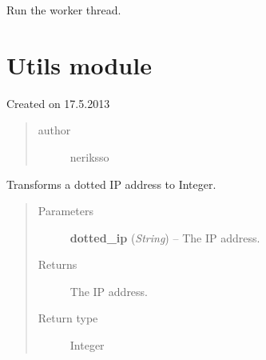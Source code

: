 \documentclass[letterpaper,10pt,english]{sphinxmanual}
\begin{document}
\begin{fulllineitems}
\begin{fulllineitems}
\end{fulllineitems}


\begin{fulllineitems}
\label{threads:threads.worker.WORKER_THREAD.run}
Run the worker thread.

\end{fulllineitems}


\end{fulllineitems}



\section{Utils module}
\label{utils:utils-module}\label{utils:module-utils}\label{utils::doc}
Created on 17.5.2013
\begin{quote}\begin{description}
\item[{author}] \leavevmode
neriksso

\end{description}\end{quote}

\begin{fulllineitems}
\label{utils:utils.DottedIPToInt}
Transforms a dotted IP address to Integer.
\begin{quote}\begin{description}
\item[{Parameters}] \leavevmode
\textbf{dotted\_ip} (\emph{String}) -- The IP address.

\item[{Returns}] \leavevmode
The IP address.

\item[{Return type}] \leavevmode
Integer

\end{description}\end{quote}

\end{fulllineitems}

\end{document}
